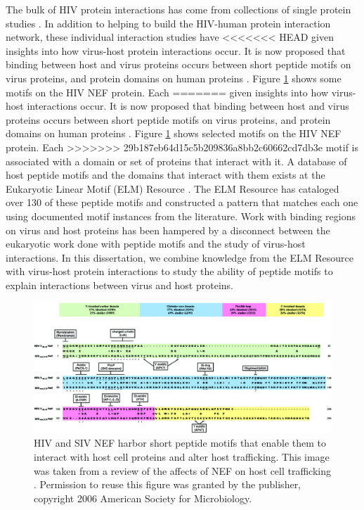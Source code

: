The bulk of HIV protein interactions has come from collections of
single protein studies \cite{mendez2010global, chatr08, ptak08,
  driscoll2009pig}. In addition to helping to build the HIV-human
protein interaction network, these individual interaction studies have
<<<<<<< HEAD
given insights into how virus-host protein interactions occur. It is
now proposed that binding between host and virus proteins occurs
between short peptide motifs on virus proteins, and protein domains on
human proteins \cite{tonikian08,shelton08,kadaveru08}. Figure
\ref{fig:intro:nef} shows some motifs on the HIV NEF protein. Each
=======
given insights into how virus-host interactions occur. It is now
proposed that binding between host and virus proteins occurs between
short peptide motifs on virus proteins, and protein domains on human
proteins \cite{tonikian08,shelton08,kadaveru08}. Figure
\ref{fig:intro:nef} shows selected motifs on the HIV NEF protein. Each
>>>>>>> 29b187eb64d15c5b209836a8bb2c60662cd7db3e
motif is associated with a domain or set of proteins that interact
with it. A database of host peptide motifs and the domains that
interact with them exists at the Eukaryotic Linear Motif (ELM)
Resource \cite{puntervoll03}. The ELM Resource has cataloged over 130
of these peptide motifs and constructed a pattern that matches each
one using documented motif instances from the literature. Work with
binding regions on virus and host proteins has been hampered by a
disconnect between the eukaryotic work done with peptide motifs and
the study of virus-host interactions. In this dissertation, we combine
knowledge from the ELM Resource with virus-host protein interactions
to study the ability of peptide motifs to explain interactions between
virus and host proteins.

\begin{figure}
\begin{center}
\includegraphics[scale=0.25]{figs/intro_nef}
\end{center}
\caption[Host peptide motifs on HIV NEF]{\small HIV and SIV NEF harbor
  short peptide motifs that enable them to interact with host cell
  proteins and alter host trafficking. This image was taken from a
  review of the affects of NEF on host cell trafficking
  \cite{roeth06}. Permission to reuse this figure was granted by the
  publisher, copyright 2006 American Society for
  Microbiology. \label{fig:intro:nef}}
\end{figure}

